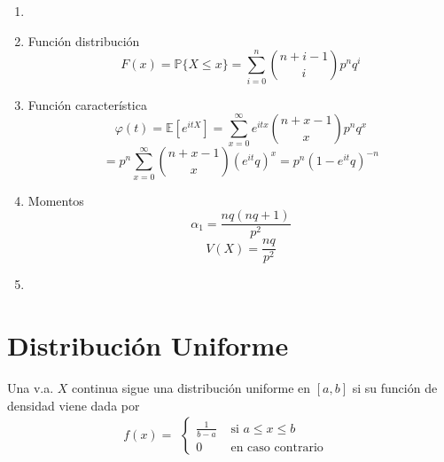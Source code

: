 \begin{prop}
  \begin{enumerate}[label=(\roman*)]
    \item []
    \item Función distribución 
      \[ 
        F(x) = \mathbb{P} \{ X \leq x \} = \sum_{i = 0}^{n} \binom{n + i -1}{i} p^{n} q^{i}
      \] 
    \item Función característica
      \[ 
        \varphi(t) = \mathbb{E} [ e^{itX} ] = \sum_{x = 0}^{\infty} e^{itx} \binom{n + x - 1}{x} p^{n} q^{x}
      \] 
      \[ 
        = p^{n} \sum_{x = 0}^{\infty} \binom{n + x - 1}{x} (e^{it} q)^{x} = p^{n}( 1 - e^{it}q)^{-n}
      \] 
    \item Momentos
      \[ 
        \alpha_{1} = \frac{nq(nq + 1)}{p^{2}} 
      \] 
      \[ 
        V(X) = \frac{nq}{p^{2}} 
      \] 
    \item
  \end{enumerate}
\end{prop}

\section{Distribución Uniforme}

\begin{defn}
  Una v.a. $X$ continua sigue una distribución uniforme en $[ a, b ]$ si su función de densidad viene dada por
  \[ 
    f(x) =
    \begin{aligned}
      \begin{cases}
        \frac{1}{b - a} & \text{ si } a \leq x \leq b \\
        0  & \text{ en caso contrario }
      \end{cases} 
    \end{aligned}
  \] 
\end{defn}


